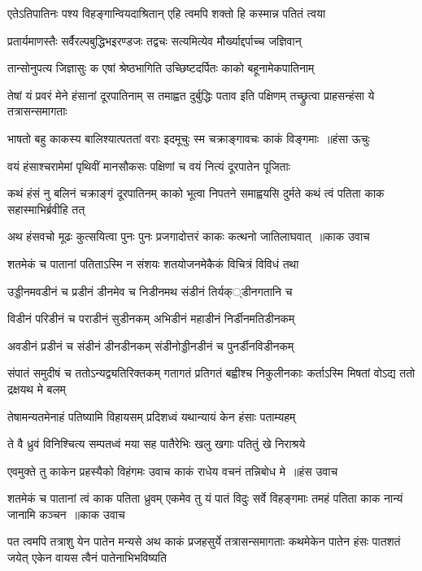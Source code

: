 \twolineshloka
{एतेऽतिपातिनः पश्य विहङ्गान्वियदाश्रितान्}
{एहि त्वमपि शक्तो हि कस्मान्न पतितं त्वया}


\twolineshloka
{प्रतार्यमाणस्तैः सर्वैरल्पबुद्धिभइरण्डजः}
{तद्वचः सत्यमित्येव मौर्ख्याद्दर्पाच्च जज्ञिवान्}


\twolineshloka
{तान्सोनुपत्य जिज्ञासुः क एषां श्रेष्ठभागिति}
{उच्छिष्टदर्पितः काको बहूनामेकपातिनाम्}


\threelineshloka
{तेषां यं प्रवरं मेने हंसानां दूरपातिनाम्}
{स तमाह्वत दुर्बुद्धिः पताव इति पक्षिणम्}
{तच्छ्रुत्वा प्राहसन्हंसा ये तत्रासन्समागताः}


\threelineshloka
{भाषतो बहु काकस्य बालिश्यात्पततां वराः}
{इदमूचुः स्म चक्राङ्गावचः काकं विङ्गमाः ॥हंसा ऊचुः}
{}


\twolineshloka
{वयं हंसाश्चरामेमां पृथिवीं मानसौकसः}
{पक्षिणां च वयं नित्यं दूरपातेन पूजिताः}


\threelineshloka
{कथं हंसं नु बलिनं चक्राङ्गं दूरपातिनम्}
{काको भूत्वा निपतने समाह्वयसि दुर्मते}
{कथं त्वं पतिता काक सहास्माभिर्ब्रवीहि तत्}


\threelineshloka
{अथ हंसवचो मूढः कुत्सयित्वा पुनः पुनः}
{प्रजगादोत्तरं काकः कत्थनो जातिलाघवात् ॥काक उवाच}
{}


\twolineshloka
{शतमेकं च पातानां पतिताऽस्मि न संशयः}
{शतयोजनमेकैकं विचित्रं विविधं तथा}


\twolineshloka
{उड्डीनमवडीनं च प्रडीनं डीनमेव च}
{निडीनमथ संडीनं तिर्यक््डीनगतानि च}


\twolineshloka
{विडीनं परिडीनं च पराडीनं सुडीनकम्}
{अभिडीनं महाडीनं निर्डीनमतिडीनकम्}


\twolineshloka
{अवडीनं प्रडीनं च संडीनं डीनडीनकम्}
{संडीनोड्डीनडीनं च पुनर्डीनविडीनकम्}


\threelineshloka
{संपातं समुदीषं च ततोऽन्यद्व्यतिरिक्तकम्}
{गतागतं प्रतिगतं बह्वीश्च निकुलीनकाः}
{कर्ताऽस्मि मिषतां वोऽद्य ततो द्रक्षयथ मे बलम्}


\twolineshloka
{तेषामन्यतमेनाहं पतिष्यामि विहायसम्}
{प्रदिशध्वं यथान्यायं केन हंसाः पताम्यहम्}


\twolineshloka
{ते वै ध्रुवं विनिश्चित्य सम्पतध्वं मया सह}
{पातैरेभिः खलु खगाः पतितुं खे निराश्रये}


\threelineshloka
{एवमुक्ते तु काकेन प्रहस्यैको विहंगमः}
{उवाच काकं राधेय वचनं तन्निबोध मे ॥हंस उवाच}
{}


\fourlineindentedshloka
{शतमेकं च पातानां त्वं काक पतिता ध्रुवम्}
{एकमेव तु यं पातं विदुः सर्वे विहङ्गमाः}
{तमहं पतिता काक नान्यं जानामि कञ्चन ॥काक उवाच}
{}


पत त्वमपि तत्राशु येन पातेन मन्यसे
\threelineshloka
{अथ काकं प्रजहसुर्ये तत्रासन्समागताः}
{कथमेकेन पातेन हंसः पातशतं जयेत्}
{एकेन वायस त्वैनं पातेनाभिभविष्यति}


